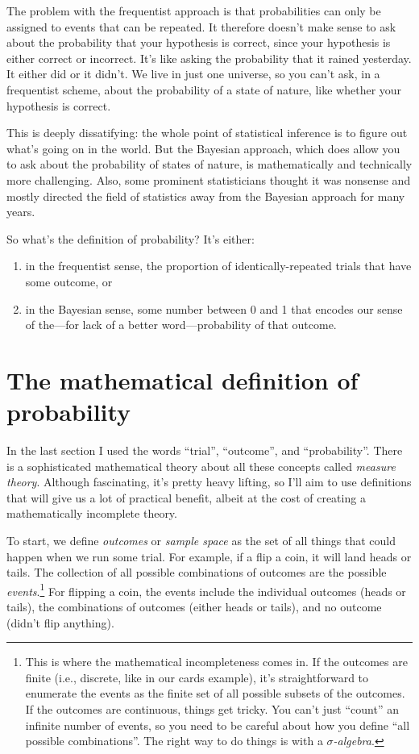 The problem with the frequentist approach is that probabilities can only be
assigned to events that can be repeated. It therefore doesn't make sense to
ask about the probability that your hypothesis is correct, since your
hypothesis is either correct or incorrect. It's like asking the probability
that it rained yesterday. It either did or it didn't.
We live in just one universe, so you can't
ask, in a frequentist scheme, about the probability of a state of nature, like
whether your hypothesis is correct.

This is deeply dissatifying: the whole point of statistical inference is to
figure out what's going on in the world. But the Bayesian approach, which does
allow you to ask about the probability of states of nature, is mathematically
and technically more challenging. Also, some prominent statisticians thought
it was nonsense and mostly directed the field of statistics away from the Bayesian
approach for many years.

So what's the definition of probability? It's either:
\begin{enumerate}
\item in the frequentist sense, the proportion of identically-repeated trials that have some outcome, or
\item in the Bayesian sense, some number between 0 and 1 that encodes our sense of the---for lack of a better word---probability of that outcome.
\end{enumerate}

\section{The mathematical definition of probability}

In the last section I used the words ``trial'', ``outcome'', and
``probability''.  There is a sophisticated mathematical theory about all these
concepts called \emph{measure theory}. Although fascinating, it's pretty heavy
lifting, so I'll aim to use definitions that will give us a lot of practical
benefit, albeit at the cost of creating a mathematically incomplete theory.

To start, we define \emph{outcomes} or \emph{sample space} as the set of all
things that could happen when we run some trial. For example, if a flip a
coin, it will land heads or tails. The collection of all possible combinations
of outcomes are the possible \emph{events}.\footnote{This is where the
mathematical incompleteness comes in. If the outcomes are finite (i.e.,
discrete, like in our cards example), it's straightforward to enumerate the
events as the finite set of all possible subsets of the outcomes. If the
outcomes are continuous, things get tricky. You can't just ``count'' an
infinite number of events, so you need to be careful about how you define
``all possible combinations''. The right way to do things is with a
\emph{$\sigma$-algebra}.} For flipping a coin, the events include the
individual outcomes (heads or tails), the combinations of outcomes (either
heads or tails), and no outcome (didn't flip anything).

